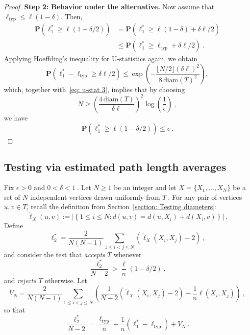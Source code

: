 \documentclass[12pt]{article}
\newcommand{\prob}[1]{\mathbf{P}\left( #1 \right)}
\begin{document}
\begin{proof}
\medskip
\noindent \textbf{Step 2: Behavior under the alternative.} Now assume that $\ell_{\mathrm{typ}} \le \ell(1 - \delta)$. Then,
\begin{align}
\prob{\ell_1^* \ge \ell(1 - \delta/2)} 
&= \prob{\ell_1^* \ge \ell(1 - \delta) + \delta \ell / 2} \nonumber\\
&\le \prob{\ell_1^* \ge \ell_{\mathrm{typ}} + \delta \ell / 2}~.
\label{eq: u-stat 3}
\end{align}
Applying Hoeffding's inequality for U-statistics again, we obtain
\begin{equation}\label{eq: u-stat hoeffding}
\prob{\ell_1^* - \ell_{\mathrm{typ}} \ge \delta \ell / 2}
\le \exp\!\left(
    -\frac{\lfloor N/2\rfloor (\delta \ell)^2}{8\,\mathrm{diam}(T)^2}
\right),
\end{equation}
which, together with~\eqref{eq: u-stat 3}, implies that by choosing
\[
N \ge \left(\frac{4\,\mathrm{diam}(T)}{\delta \ell}\right)^2 
    \log\!\left(\frac{1}{\epsilon}\right)~,
\]
we have
\[
\prob{\ell_1^* \ge \ell(1 - \delta/2)} \le \epsilon~.
\]
\end{proof}

\subsection{Testing via estimated path length averages}\label{sec: typ dist 2}
Fix $\epsilon> 0 $ and $0<\delta<1~.$ Let $N\ge 1$ be an integer and let $X = \{X_1,\dots,X_N\}$ be a set of $N$ independent vertices drawn uniformly from $T~.$
For any pair of vertices $u, v \in T$, recall the definition from Section~\ref{section: Testing diameters}:
$$\widetilde{\ell}_X(u,v) := \left| \left\{ 1 \le i \le N : d(u,v) = d(u, X_i) + d(X_i, v) \right\} \right|~.$$
Define $$\ell^*_2 =\frac{2}{N(N-1)}\sum_{1\le i<j\le N} \left(\widetilde{\ell}_X(X_i,X_j) -2\right)~,$$ and consider the test that \emph{accepts} $T$ whenever $$\frac{\ell_2^*}{N-2}>\frac{ \ell}{n}(1-\delta/2)~,$$ and \emph{rejects} $T$ otherwise. 
Let $$V_N= \frac{2}{N(N-1)}\sum_{1\le i < j \le N} \left(\frac{1}{N-2}(\widetilde{\ell}_X(X_i,X_j) -2) - \frac{1}{n}\ell(X_i,X_j)\right)~,$$
so that 
\begin{equation}\label{eq: typ distance decomposition}
    \frac{\ell_2^*}{N-2} = \frac{\ell_{\textrm{typ}}}{n} + \frac{1}{n}(\ell_1^*-\ell_{\textrm{typ}}) + V_N~.
\end{equation}
\end{document}
